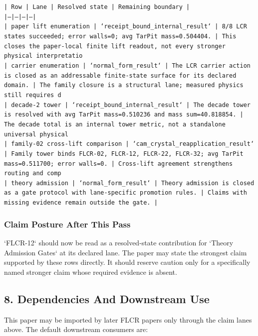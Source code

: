 \documentclass[11pt]{article}
\begin{document}
\noindent\texttt{| Row | Lane | Resolved state | Remaining boundary |}\\
\noindent\texttt{|---|---|---|---|}\\
\noindent\texttt{| paper lift enumeration | `receipt\_bound\_internal\_result` | 8/8 LCR states succeeded; error walls=0; avg TarPit mass=0.504404. | This closes the paper-local finite lift readout, not every stronger physical interpretatio}\\
\noindent\texttt{| carrier enumeration | `normal\_form\_result` | The LCR carrier action is closed as an addressable finite-state surface for its declared domain. | The family closure is a structural lane; measured physics still requires d}\\
\noindent\texttt{| decade-2 tower | `receipt\_bound\_internal\_result` | The decade tower is resolved with avg TarPit mass=0.510236 and mass sum=40.818854. | The decade total is an internal tower metric, not a standalone universal physical }\\
\noindent\texttt{| family-02 cross-lift comparison | `cam\_crystal\_reapplication\_result` | Family tower binds FLCR-02, FLCR-12, FLCR-22, FLCR-32; avg TarPit mass=0.511700; error walls=0. | Cross-lift agreement strengthens routing and comp}\\
\noindent\texttt{| theory admission | `normal\_form\_result` | Theory admission is closed as a gate protocol with lane-specific promotion rules. | Claims with missing evidence remain outside the gate. |}\\

\subsubsection*{Claim Posture After This Pass}

`FLCR-12` should now be read as a resolved-state contribution for `Theory Admission Gates` at its declared lane. The paper may state the strongest claim supported by these rows directly. It should reserve caution only for a specifically named stronger claim whose required evidence is absent.

\subsection*{8. Dependencies And Downstream Use}

This paper may be imported by later FLCR papers only through the claim lanes
above. The default downstream consumers are:
\end{document}
